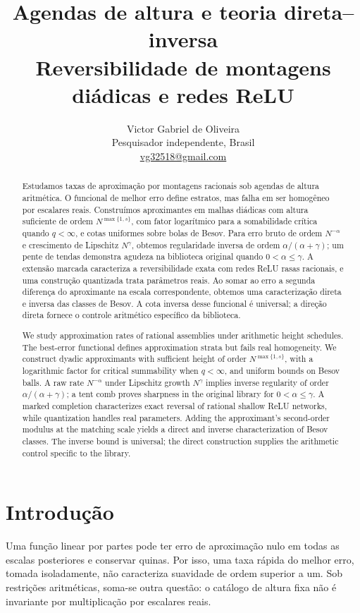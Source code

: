 \documentclass[11pt,a4paper]{article}
\title{\vspace{-12mm}\bfseries Agendas de altura e teoria direta--inversa\\[3pt]\large Reversibilidade de montagens diádicas e redes ReLU}
\author{Victor Gabriel de Oliveira\\\small Pesquisador independente, Brasil\\\small\href{mailto:vg32518@gmail.com}{vg32518@gmail.com}}
\date{}
\theoremstyle{definition}
\theoremstyle{remark}
\begin{document}
\maketitle\thispagestyle{plain}
\begin{abstract}Estudamos taxas de aproximação por montagens racionais sob agendas de altura aritmética. O funcional de melhor erro define estratos, mas falha em ser homogêneo por escalares reais. Construímos aproximantes em malhas diádicas com altura suficiente de ordem $N^{\max\{1,s\}}$, com fator logarítmico para a somabilidade crítica quando $q<\infty$, e cotas uniformes sobre bolas de Besov. Para erro bruto de ordem $N^{-\alpha}$ e crescimento de Lipschitz $N^\gamma$, obtemos regularidade inversa de ordem $\alpha/(\alpha+\gamma)$; um pente de tendas demonstra agudeza na biblioteca original quando $0<\alpha\le\gamma$. A extensão marcada caracteriza a reversibilidade exata com redes ReLU rasas racionais, e uma construção quantizada trata parâmetros reais. Ao somar ao erro a segunda diferença do aproximante na escala correspondente, obtemos uma caracterização direta e inversa das classes de Besov. A cota inversa desse funcional é universal; a direção direta fornece o controle aritmético específico da biblioteca.\end{abstract}
\renewcommand{\abstractname}{Abstract}
\begin{abstract}We study approximation rates of rational assemblies under arithmetic height schedules. The best-error functional defines approximation strata but fails real homogeneity. We construct dyadic approximants with sufficient height of order $N^{\max\{1,s\}}$, with a logarithmic factor for critical summability when $q<\infty$, and uniform bounds on Besov balls. A raw rate $N^{-\alpha}$ under Lipschitz growth $N^\gamma$ implies inverse regularity of order $\alpha/(\alpha+\gamma)$; a tent comb proves sharpness in the original library for $0<\alpha\le\gamma$. A marked completion characterizes exact reversal of rational shallow ReLU networks, while quantization handles real parameters. Adding the approximant's second-order modulus at the matching scale yields a direct and inverse characterization of Besov classes. The inverse bound is universal; the direct construction supplies the arithmetic control specific to the library.\end{abstract}
\section{Introdução}
Uma função linear por partes pode ter erro de aproximação nulo em todas as escalas posteriores e conservar quinas. Por isso, uma taxa rápida do melhor erro, tomada isoladamente, não caracteriza suavidade de ordem superior a um. Sob restrições aritméticas, soma-se outra questão: o catálogo de altura fixa não é invariante por multiplicação por escalares reais.
\end{document}
